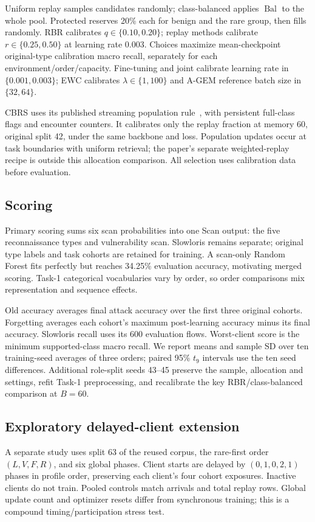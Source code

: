 \documentclass[journal,10pt]{IEEEtran}
\begin{document}
Uniform replay samples candidates randomly; class-balanced applies $\operatorname{Bal}$ to the whole pool. Protected reserves 20\% each for benign and the rare group, then fills randomly. RBR calibrates $q\in\{0.10,0.20\}$; replay methods calibrate $r\in\{0.25,0.50\}$ at learning rate 0.003. Choices maximize mean-checkpoint original-type calibration macro recall, separately for each environment/order/capacity. Fine-tuning and joint calibrate learning rate in $\{0.001,0.003\}$; EWC calibrates $\lambda\in\{1,100\}$ and A-GEM reference batch size in $\{32,64\}$.

CBRS uses its published streaming population rule~\cite{cbrs}, with persistent full-class flags and encounter counters. It calibrates only the replay fraction at memory 60, original split 42, under the same backbone and loss. Population updates occur at task boundaries with uniform retrieval; the paper's separate weighted-replay recipe is outside this allocation comparison. All selection uses calibration data before evaluation.

\subsection{Scoring}
Primary scoring sums six scan probabilities into one Scan output: the five reconnaissance types and vulnerability scan. Slowloris remains separate; original type labels and task cohorts are retained for training. A scan-only Random Forest fits perfectly but reaches 34.25\% evaluation accuracy, motivating merged scoring. Task-1 categorical vocabularies vary by order, so order comparisons mix representation and sequence effects.

Old accuracy averages final attack accuracy over the first three original cohorts. Forgetting averages each cohort's maximum post-learning accuracy minus its final accuracy. Slowloris recall uses its 600 evaluation flows. Worst-client score is the minimum supported-class macro recall. We report means and sample SD over ten training-seed averages of three orders; paired 95\% $t_9$ intervals use the ten seed differences. Additional role-split seeds 43--45 preserve the sample, allocation and settings, refit Task-1 preprocessing, and recalibrate the key RBR/class-balanced comparison at $B=60$.

\subsection{Exploratory delayed-client extension}
A separate study uses split 63 of the reused corpus, the rare-first order $(L,V,F,R)$, and six global phases. Client starts are delayed by $(0,1,0,2,1)$ phases in profile order, preserving each client's four cohort exposures. Inactive clients do not train. Pooled controls match arrivals and total replay rows. Global update count and optimizer resets differ from synchronous training; this is a compound timing/participation stress test.
\end{document}
